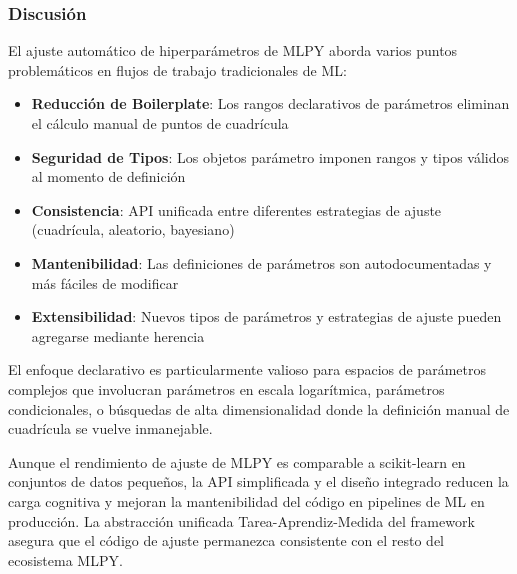 \subsubsection{Discusión}

El ajuste automático de hiperparámetros de MLPY aborda varios puntos problemáticos en flujos de trabajo tradicionales de ML:

\begin{itemize}
    \item \textbf{Reducción de Boilerplate}: Los rangos declarativos de parámetros eliminan el cálculo manual de puntos de cuadrícula
    \item \textbf{Seguridad de Tipos}: Los objetos parámetro imponen rangos y tipos válidos al momento de definición
    \item \textbf{Consistencia}: API unificada entre diferentes estrategias de ajuste (cuadrícula, aleatorio, bayesiano)
    \item \textbf{Mantenibilidad}: Las definiciones de parámetros son autodocumentadas y más fáciles de modificar
    \item \textbf{Extensibilidad}: Nuevos tipos de parámetros y estrategias de ajuste pueden agregarse mediante herencia
\end{itemize}

El enfoque declarativo es particularmente valioso para espacios de parámetros complejos que involucran parámetros en escala logarítmica, parámetros condicionales, o búsquedas de alta dimensionalidad donde la definición manual de cuadrícula se vuelve inmanejable.

Aunque el rendimiento de ajuste de MLPY es comparable a scikit-learn en conjuntos de datos pequeños, la API simplificada y el diseño integrado reducen la carga cognitiva y mejoran la mantenibilidad del código en pipelines de ML en producción. La abstracción unificada Tarea-Aprendiz-Medida del framework asegura que el código de ajuste permanezca consistente con el resto del ecosistema MLPY.
